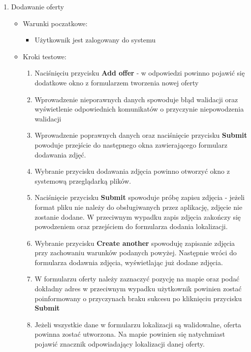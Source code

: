 \begin{enumerate}
 \item Dodawanie oferty
  \begin{itemize}
   \item Warunki poczatkowe:
    \begin{itemize}
     \item Użytkownik jest zalogowany do systemu
    \end{itemize}
   \item Kroki testowe:
    \begin{enumerate}
     \item Naciśnięciu przycisku \textbf{Add offer} - w odpowiedzi powinno pojawić się dodatkowe okno z formularzem tworzenia nowej oferty
     \item Wprowadzenie nieporawnych danych spowoduje błąd walidacji oraz wyświetlenie odpowiednich komunikatów o przyczynie niepowodzenia walidacji
     \item Wprowadzenie poprawnych danych oraz naciśnięcie przycisku \textbf{Submit} powoduje przejście do następnego okna zawierającego formularz dodawania zdjęć.
     \item Wybranie przycisku dodawania zdjęcia powinno otworzyć okno z systemową przeglądarką plików.
     \item Naciśnięcie przycisku \textbf{Submit} spowoduje próbę zapisu zdjęcia - jeżeli format pliku nie należy do obsługiwanych przez aplikację, zdjęcie nie zostanie dodane. W przeciwnym wypadku zapis zdjęcia zakończy się powodzeniem oraz przejściem do formularza dodania lokalizacji.
     \item Wybranie przycisku \textbf{Create another} spowoduję zapisanie zdjęcia przy zachowaniu warunków podanych powyżej. Następnie wróci do formularza dodawnia zdjęcia, wyświetlając już dodane zdjęcia.
     \item W formularzu oferty należy zaznaczyć pozycję na mapie oraz podać dokładny adres w przeciwnym wypadku użytkownik powinien zostać poinformowany o przyczynach braku sukcesu po kliknięciu przycisku \textbf{Submit}
     \item Jeżeli wszystkie dane w formularzu lokalizacji są walidowalne, oferta powinna zostać utworzona. Na mapie powinien się natychmiast pojawić znacznik odpowiadający lokalizacji danej oferty.
    \end{enumerate}
  \end{itemize}


\end{enumerate}
